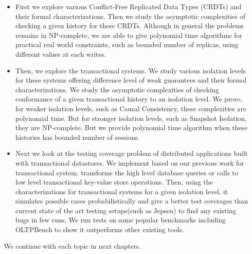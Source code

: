 \begin{itemize}
  \item First we explore various Conflict-Free Replicated Data Types (CRDTs) and their formal characterizations. Then we study the asymptotic complexities of checking a given history for these CRDTs. Although in general the problems remains in NP-complete, we are able to give polynomial time algorithms for practical real world constraints, such as bounded number of replicas, using different values at each writes.
  \item Then, we explore the transactional systems. We study various isolation levels for these systems offering difference level of weak guarantees and their formal characterizations. We study the asymptotic complexities of checking conformance of a given transactional history to an isolation level. We prove, for weaker isolation levels, such as Causal Consistency, these complexities are polynomial time. But for stronger isolation levels, such as Snapshot Isolation, they are NP-complete. But we provide polynomial time algorithm when these histories has bounded number of sessions.
  \item Next we look at the testing coverage problem of distributed applications built with transactional datastores. We implement \tool{} based on our previous work for transactional system. \tool{} transforms the high level database queries or calls to low level transactional key-value store operations. Then, using the characterizations for transactional systems for a given isolation level, it simulates possible cases probabilistically and give a better test coverages than current state of the art testing setups(such as Jepsen) to find any existing bugs in few runs. We run tests on some popular benchmarks including OLTPBench to show it outperforms other existing tools.
\end{itemize}

We continue with each topic in next chapters.